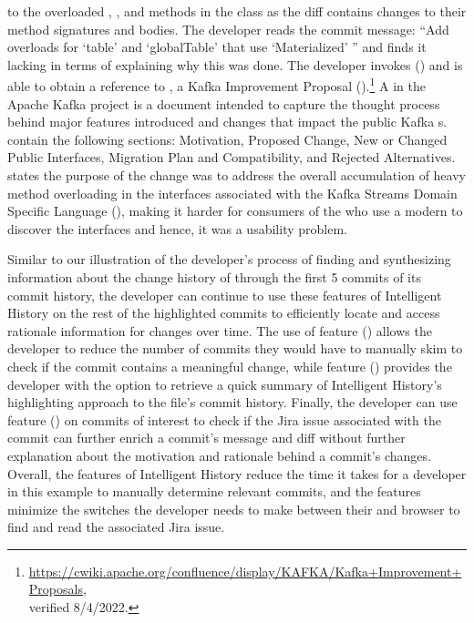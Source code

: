 \noindent to the overloaded , , and  methods in the  class as the diff contains changes to their method signatures and bodies.
The developer reads the commit message: 
``Add overloads for `table' and `globalTable' that use `Materialized' '' 
and finds it lacking in terms of explaining why this was done.
The developer invokes () and is able to obtain a reference to , 
a Kafka Improvement Proposal ().\footnote{\url{https://cwiki.apache.org/confluence/display/KAFKA/Kafka+Improvement+Proposals}, \\verified 8/4/2022.}
A  in the Apache Kafka project is a document intended to capture the thought process behind major features 
introduced and changes that impact the public Kafka s. 
 contain the following sections: Motivation, Proposed Change, New or Changed Public Interfaces, Migration Plan and Compatibility, 
and Rejected Alternatives.
 states the purpose of the change was to address the overall accumulation of heavy method overloading in the 
interfaces associated with the Kafka Streams Domain Specific Language (), 
making it harder for consumers of the  who use a modern  to discover the interfaces and hence, it was a usability problem.

Similar to our illustration of the developer's process of finding and synthesizing information about the 
change history of  through the first 5 commits of its commit history, 
the developer can continue to use these features of Intelligent History on the rest of the highlighted commits 
to efficiently locate and access rationale information for changes over time.
The use of feature () allows the developer to reduce the number of commits they would have 
to manually skim to check if the commit contains a meaningful change, while feature () provides the developer with the option to retrieve a quick summary of Intelligent History's highlighting approach to the file's commit history.
Finally, the developer can use feature () on commits of interest to check if the Jira issue 
associated with the commit can further enrich a commit's message and diff without further explanation about the motivation and rationale behind a commit's changes.
Overall, the features of Intelligent History reduce the time it takes for a developer 
in this example to manually determine relevant commits, and the features minimize the switches the developer needs 
to make between their  and browser to find and read the associated Jira issue.

\endinput

Any text after an \endinput is ignored.
You could put scraps here or things in progress.